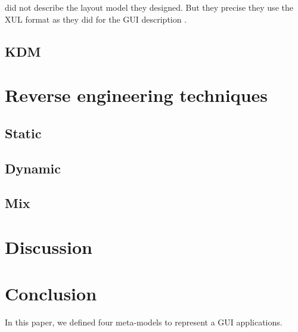 \documentclass[conference]{IEEEtran}
\begin{document}
\citet{samir2007swing2script} did not describe the layout model they designed.
But they precise they use the XUL format as they did for the GUI description .


\subsection{KDM}
\label{sec:kdm}

\section{Reverse engineering techniques}
\label{sec:reverseEngineering}

\subsection{Static}
\label{sec:reverseStatic}

\subsection{Dynamic}
\label{sec:reverseDynamic}

\subsection{Mix}
\label{sec:reverseMix}

\section{Discussion}
\label{sec:discussion}



\section{Conclusion}
\label{sec:conclusion}


In this paper, we defined four meta-models to represent a GUI applications.
\end{document}
